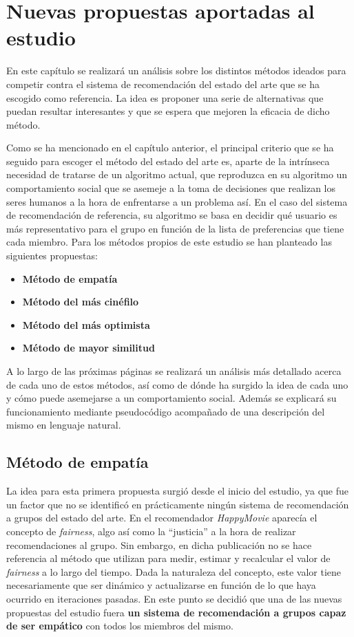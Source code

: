 \chapter{Nuevas propuestas aportadas al estudio}

En este capítulo se realizará un análisis sobre los distintos métodos ideados para competir contra el sistema de recomendación del estado del arte que se ha escogido como referencia. La idea es proponer una serie de alternativas que puedan resultar interesantes y que se espera que mejoren la eficacia de dicho método.

Como se ha mencionado en el capítulo anterior, el principal criterio que se ha seguido para escoger el método del estado del arte es, aparte de la intrínseca necesidad de tratarse de un algoritmo actual, que reproduzca en su algoritmo un comportamiento social que se asemeje a la toma de decisiones que realizan los seres humanos a la hora de enfrentarse a un problema así. En el caso del sistema de recomendación de referencia, su algoritmo se basa en decidir qué usuario es más representativo para el grupo en función de la lista de preferencias que tiene cada miembro. Para los métodos propios de este estudio se han planteado las siguientes propuestas:

\begin{itemize}
	\item \textbf{Método de empatía}
	\item \textbf{Método del más cinéfilo}
	\item \textbf{Método del más optimista}
	\item \textbf{Método de mayor similitud}
\end{itemize}

A lo largo de las próximas páginas se realizará un análisis más detallado acerca de cada uno de estos métodos, así como de dónde ha surgido la idea de cada uno y cómo puede asemejarse a un comportamiento social. Además se explicará su funcionamiento mediante pseudocódigo acompañado de una descripción del mismo en lenguaje natural.

\section{Método de empatía}

La idea para esta primera propuesta surgió desde el inicio del estudio, ya que fue un factor que no se identificó en prácticamente ningún sistema de recomendación a grupos del estado del arte. En el recomendador \textit{HappyMovie} \cite{happymovie2011} aparecía el concepto de \textit{fairness}, algo así como la ``justicia'' a la hora de realizar recomendaciones al grupo. Sin embargo, en dicha publicación no se hace referencia al método que utilizan para medir, estimar y recalcular el valor de \textit{fairness} a lo largo del tiempo. Dada la naturaleza del concepto, este valor tiene necesariamente que ser dinámico y actualizarse en función de lo que haya ocurrido en iteraciones pasadas. En este punto se decidió que una de las nuevas propuestas del estudio fuera \textbf{un sistema de recomendación a grupos capaz de ser empático} con todos los miembros del mismo.

